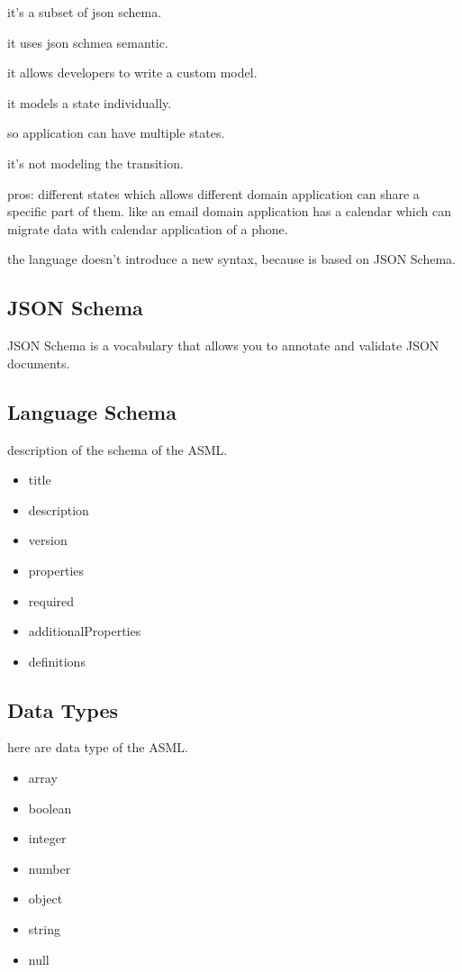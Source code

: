 it's a subset of json schema.

it uses json schmea semantic.

it allows developers to write a custom model.

it models a state individually.

so application can have multiple states.

it's not modeling the transition.

pros:
different states which allows different domain application can share a specific part of them. like an email domain application has a calendar which can migrate data with calendar application of a phone.

the language doesn't introduce a new syntax, because is based on JSON Schema.

\subsection{JSON Schema}
JSON Schema is a vocabulary that allows you to annotate and validate JSON documents. 

\subsection{Language Schema}
description of the schema of the ASML.

\begin{itemize}
\item title
\item description
\item version
\item properties
\item required
\item additionalProperties
\item definitions
\end{itemize}

\subsection{Data Types}
here are data type of the ASML.


\begin{itemize}
\item array
\item boolean
\item integer
\item number
\item object
\item string
\item null
\end{itemize}

